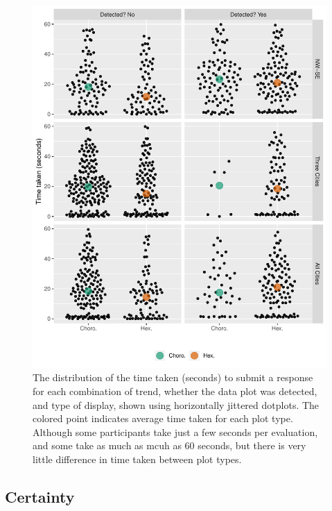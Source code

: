 \documentclass[conference,final,]{IEEEtran}
\makeatletter
\def\maxwidth{\ifdim\Gin@nat@width>\linewidth\linewidth
\else\Gin@nat@width\fi}
\let\Oldincludegraphics\includegraphics
\renewcommand{\includegraphics}[1]{\Oldincludegraphics[width=\maxwidth]{#1}}
\makeatother
\begin{document}
\begin{figure}
\centering
\includegraphics{paper_files/figure-latex/beeswarm-1.pdf}
\caption{\label{fig:beeswarm}The distribution of the time taken (seconds) to submit a response for each combination of trend, whether the data plot was detected, and type of display, shown using horizontally jittered dotplots. The colored point indicates average time taken for each plot type. Although some participants take just a few seconds per evaluation, and some take as much as mcuh as 60 seconds, but there is very little difference in time taken between plot types.}
\end{figure}

\hypertarget{certainty}{%
\subsection{Certainty}\label{certainty}}
\end{document}
